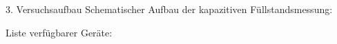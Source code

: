 3.	Versuchsaufbau
Schematischer Aufbau der kapazitiven Füllstandsmessung:

Liste verfügbarer Geräte:

